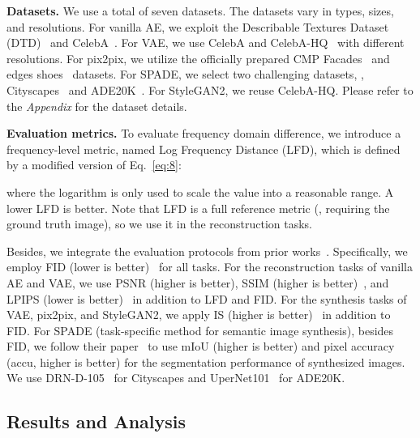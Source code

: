 \documentclass[10pt,twocolumn,letterpaper]{article}
\begin{document}
\vspace{0.05cm}
\noindent
\textbf{Datasets.}
We use a total of seven datasets.
The datasets vary in types, sizes, and resolutions.
For vanilla AE, we exploit the Describable Textures Dataset (DTD)~\cite{DTD} and CelebA~\cite{celeba}.
For VAE, we use CelebA and CelebA-HQ~\cite{pggan} with different resolutions.
For pix2pix, we utilize the officially prepared CMP Facades~\cite{cmpfacades} and edges  shoes~\cite{shoesutzappos50K} datasets.
For SPADE, we select two challenging datasets, \ie, Cityscapes~\cite{cityscapes} and ADE20K~\cite{ade20k}.
For StyleGAN2, we reuse CelebA-HQ.
Please refer to the \textit{Appendix} for the dataset details.








\vspace{0.05cm}
\noindent
\textbf{Evaluation metrics.}
To evaluate frequency domain difference, we introduce a frequency-level metric, named Log Frequency Distance (LFD), which is defined by a modified version of Eq.~\eqref{eq:8}:

where the logarithm is only used to scale the value into a reasonable range.
A lower LFD is better. Note that LFD is a full reference metric (\ie, requiring the ground truth image), so we use it in the reconstruction tasks.

Besides, we integrate the evaluation protocols from prior works~\cite{nerf,BigGAN,SPADE,tsit}.
Specifically, we employ FID (lower is better)~\cite{TTUR} for all tasks.
For the reconstruction tasks of vanilla AE and VAE, we use PSNR (higher is better), SSIM (higher is better)~\cite{ssim}, and LPIPS (lower is better)~\cite{lpips} in addition to LFD and FID.
For the synthesis tasks of VAE, pix2pix, and StyleGAN2, we apply IS (higher is better)~\cite{is} in addition to FID.
For SPADE (task-specific method for semantic image synthesis), besides FID, we follow their paper~\cite{SPADE} to use mIoU (higher is better) and pixel accuracy (accu, higher is better) for the segmentation performance of synthesized images. We use DRN-D-105~\cite{drn} for Cityscapes and UperNet101~\cite{upernet} for ADE20K.





\subsection{Results and Analysis}
\label{sec:results}
\end{document}
